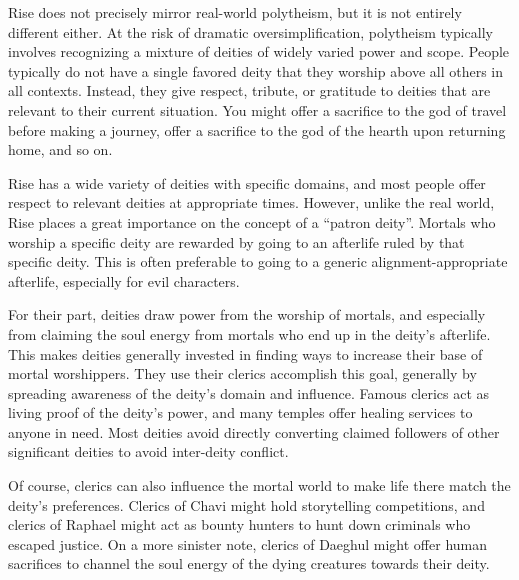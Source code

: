         Rise does not precisely mirror real-world polytheism, but it is not entirely different either.
        At the risk of dramatic oversimplification, polytheism typically involves recognizing a mixture of deities of widely varied power and scope.
        People typically do not have a single favored deity that they worship above all others in all contexts.
        Instead, they give respect, tribute, or gratitude to deities that are relevant to their current situation.
        You might offer a sacrifice to the god of travel before making a journey, offer a sacrifice to the god of the hearth upon returning home, and so on.

        Rise has a wide variety of deities with specific domains, and most people offer respect to relevant deities at appropriate times.
        However, unlike the real world, Rise places a great importance on the concept of a ``patron deity''.
        Mortals who worship a specific deity are rewarded by going to an afterlife ruled by that specific deity.
        This is often preferable to going to a generic alignment-appropriate afterlife, especially for evil characters.

        For their part, deities draw power from the worship of mortals, and especially from claiming the soul energy from mortals who end up in the deity's afterlife.
        This makes deities generally invested in finding ways to increase their base of mortal worshippers.
        They use their clerics accomplish this goal, generally by spreading awareness of the deity's domain and influence.
        Famous clerics act as living proof of the deity's power, and many temples offer healing services to anyone in need.
        Most deities avoid directly converting claimed followers of other significant deities to avoid inter-deity conflict.

        Of course, clerics can also influence the mortal world to make life there match the deity's preferences.
        Clerics of Chavi might hold storytelling competitions, and clerics of Raphael might act as bounty hunters to hunt down criminals who escaped justice.
        On a more sinister note, clerics of Daeghul might offer human sacrifices to channel the soul energy of the dying creatures towards their deity.
